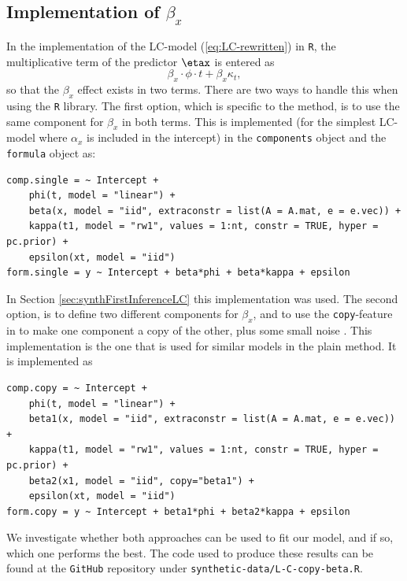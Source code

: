 \subsection{Implementation of $\beta_x$}
In the implementation of the LC-model (\ref{eq:LC-rewritten}) in \texttt{R}, the multiplicative term of the predictor $\etax$ is entered as
\begin{equation}
    \beta_x\cdot\phi \cdot t + \beta_x\kappa_t,
\end{equation}
so that the $\beta_x$ effect exists in two terms. There are two ways to handle this when using the \texttt{R} \inlabru library. The first option, which is specific to the \inlabru method, is to use the same component for $\beta_x$ in both terms. This is implemented (for the simplest LC-model where $\alpha_x$ is included in the intercept) in the \texttt{components} object and the \texttt{formula} object as:
\begin{verbatim}
comp.single = ~ Intercept + 
    phi(t, model = "linear") + 
    beta(x, model = "iid", extraconstr = list(A = A.mat, e = e.vec)) + 
    kappa(t1, model = "rw1", values = 1:nt, constr = TRUE, hyper = pc.prior) + 
    epsilon(xt, model = "iid")
form.single = y ~ Intercept + beta*phi + beta*kappa + epsilon
\end{verbatim}
In Section \ref{sec:synthFirstInferenceLC} this implementation was used. The second option, is to define two different components for $\beta_x$, and to use the \texttt{copy}-feature in \inla to make one component a copy of the other, plus some small noise \parencite{MARTINS201368}. This implementation is the one that is used for similar models in the plain \inla method. It is implemented as
\begin{verbatim}
comp.copy = ~ Intercept + 
    phi(t, model = "linear") + 
    beta1(x, model = "iid", extraconstr = list(A = A.mat, e = e.vec)) + 
    kappa(t1, model = "rw1", values = 1:nt, constr = TRUE, hyper = pc.prior) + 
    beta2(x1, model = "iid", copy="beta1") +
    epsilon(xt, model = "iid")
form.copy = y ~ Intercept + beta1*phi + beta2*kappa + epsilon
\end{verbatim}
We investigate whether both approaches can be used to fit our model, and if so, which one performs the best. The code used to produce these results can be found at the \texttt{GitHub} repository under \texttt{synthetic-data/L-C-copy-beta.R}. 

